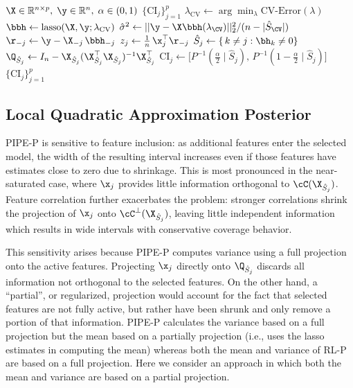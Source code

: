 \begin{algorithm}[!ht]
\caption{PIPE-P Intervals at a single CV-chosen \(\lambda\)}
\label{alg:singlelambda-ci}
\begin{algorithmic}[1]
\Require \(\X\in\mathbb{R}^{n\times p},\;\y\in\mathbb{R}^n,\;\alpha\in(0,1)\)
\Ensure \(\{\mathrm{CI}_j\}_{j=1}^p\)
  \State \(\lambda_{\mathrm{CV}}\gets\arg\min_{\lambda}\mathrm{CV\mbox{-}Error}(\lambda)\) 
  \State \(\bbh\gets\mathrm{lasso}(\X,\y;\lambda_{\mathrm{CV}})\)
  \State $\hat{\sigma}^2 \gets ||\y - \X\bbh({\lambda_{\CV}})||_2^2 / (n - |\hat{S}_{\CV}|)$ 
    \State \(\r_{-j}\gets \y - \X_{-j}\,\bbh_{-j}\)
    \State \(z_j\gets \tfrac{1}{n}\,\x_j^\top \r_{-j}\)
    \State \(\hat S_j\gets\{\,k\neq j : \bh_k\neq0\}\)
    \State \(\Q_{\hat S_j}\gets I_n - \X_{\hat S_j}(\X_{\hat S_j}^\top \X_{\hat S_j})^{-1}\X_{\hat S_j}^\top\)
    \State \(\mathrm{CI}_j\gets \bigl[P^{-1}(\tfrac{\alpha}{2}\mid\hat S_j),\,P^{-1}(1-\tfrac{\alpha}{2}\mid\hat S_j)\bigr]\)
  \EndFor
  \State \Return \(\{\mathrm{CI}_j\}_{j=1}^p\)
\end{algorithmic}
\end{algorithm}

\subsection{Local Quadratic Approximation Posterior}
\label{Sec:LQAP}

PIPE-P is sensitive to feature inclusion: as additional features enter the selected model, the width of the resulting interval increases even if those features have estimates close to zero due to shrinkage. This is most pronounced in the near-saturated case, where $\x_j$ provides little information orthogonal to $\cC(\X_{\hat{S}_j})$. Feature correlation further exacerbates the problem: stronger correlations shrink the projection of $\x_j$ onto $\cC^\bot(\X_{\hat{S}_j})$, leaving little independent information which results in wide intervals with conservative coverage behavior.

This sensitivity arises because PIPE-P computes variance using a full projection onto the active features. Projecting $\x_j$ directly onto $\Q_{\hat S_j}$ discards all information not orthogonal to the selected features. On the other hand, a ``partial'', or regularized, projection would account for the fact that selected features are not fully active, but rather have been shrunk and only remove a portion of that information. PIPE-P calculates the variance based on a full projection but the mean based on a partially projection (i.e., uses the lasso estimates in computing the mean) whereas both the mean and variance of RL-P are based on a full projection. Here we consider an approach in which both the mean and variance are based on a partial projection.

